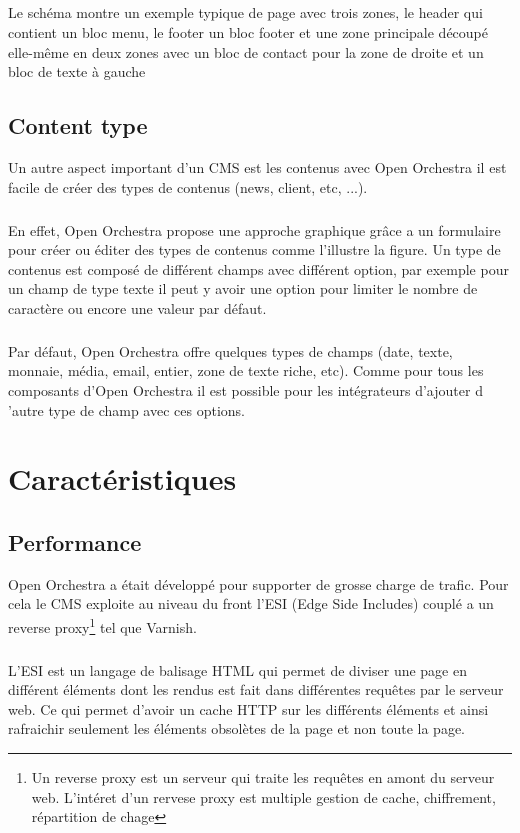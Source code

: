          \paragraph{}
		Le schéma montre un exemple typique de page avec trois zones, le header qui contient un bloc menu, le footer un bloc footer et une zone principale découpé elle-même en deux zones avec un bloc de contact pour la zone de droite et un bloc de texte à gauche   
         \section{Content type}
         Un autre aspect important d'un CMS est les contenus avec Open Orchestra il est facile de créer des types de contenus (news, client, etc, ...).
          \paragraph{}
          En effet, Open Orchestra propose une approche graphique grâce a un formulaire pour créer ou éditer des types de contenus comme l'illustre la figure.
          Un type de contenus est composé de différent champs avec différent option, par exemple pour un champ de type texte il peut y avoir une option pour limiter le nombre de caractère ou encore une valeur par défaut.
          \paragraph{}
          Par défaut, Open Orchestra offre quelques types de champs (date, texte, monnaie, média, email, entier, zone de texte riche, etc). Comme pour tous les composants d'Open Orchestra il est possible pour les intégrateurs d'ajouter d 'autre type de champ avec ces options.  
\chapter{Caractéristiques}
   \section{Performance}
   Open Orchestra a était développé pour supporter de grosse charge de trafic. Pour cela le CMS exploite au niveau du front l'ESI (Edge Side Includes) couplé a un reverse proxy\footnote{Un reverse proxy est un serveur qui traite les requêtes en amont du serveur web. L'intéret d'un rervese proxy est multiple gestion de cache, chiffrement, répartition de chage} tel que Varnish.
   \paragraph{}
   L'ESI est un langage de balisage HTML qui permet de diviser une page en différent éléments dont les rendus est fait dans différentes requêtes par le serveur web. Ce qui permet d'avoir un cache HTTP sur les différents éléments et ainsi rafraichir seulement les éléments obsolètes de la page et non toute la page.
